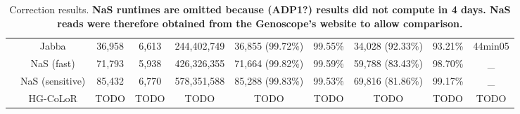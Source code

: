 \documentclass[long, final]{jobim2017}
\begin{document}
\begin{table}[ht]
\begin{center}
{\begin{tabular}{|c|c|c|c|c|c|c|c|c|c|}
		& Jabba & 36,958 & 6,613 & 244,402,749 & 36,855 (99.72\%) & 99.55\% & 34,028 (92.33\%) & 93.21\% & 44min05 \\
		& NaS (fast) & 71,793 & 5,938 & 426,326,355 & 71,664 (99.82\%) & 99.59\% & 59,788 (83.43\%) & 98.70\% & \_ \\
		& NaS (sensitive) & 85,432 & 6,770 & 578,351,588 & 85,288 (99.83\%) & 99.53\% & 69,816 (81.86\%) & 99.17\% & \_ \\
		& HG-CoLoR & TODO & TODO & TODO & TODO & TODO & TODO & TODO & TODO \\
		\hline
	\end{tabular}
	}
	\end{center}
	\caption{Correction results. \textbf{NaS runtimes are omitted because (ADP1?) results did not compute in 4 days. NaS reads 
	were therefore obtained from the Genoscope's website to allow comparison.} \label{tabres}}
\end{table}
\end{document}
